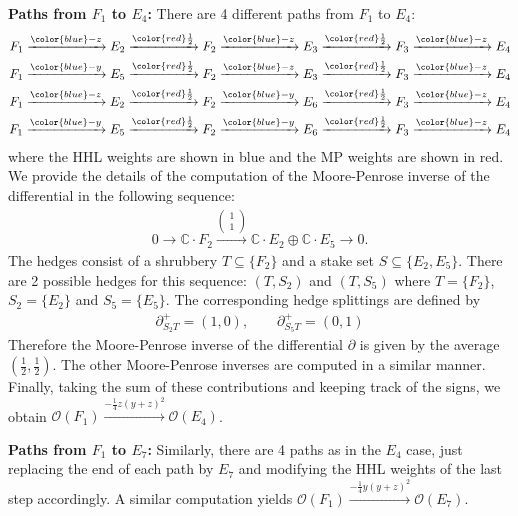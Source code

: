 \documentclass[11pt,reqno]{amsart}
\def\C {{\mathbb C}}
\theoremstyle{definition}
\numberwithin{equation}{section}
\begin{document}
{\bf Paths from $F_1$ to $E_4$:} There are 4 different paths from $F_1$ to $E_4$:
\begin{align*}
    F_1\xrightarrow{\color{blue} -z} E_2\xrightarrow{\color{red}\frac{1}{2}} F_2\xrightarrow{\color{blue}-z} E_3\xrightarrow{\color{red}\frac{1}{2}} F_3\xrightarrow{\color{blue}-z} E_4 \\
    F_1\xrightarrow{\color{blue} -y} E_5\xrightarrow{\color{red}\frac{1}{2}} F_2\xrightarrow{\color{blue}-z} E_3\xrightarrow{\color{red}\frac{1}{2}} F_3\xrightarrow{\color{blue}-z} E_4 \\
    F_1\xrightarrow{\color{blue} -z} E_2\xrightarrow{\color{red}\frac{1}{2}} F_2\xrightarrow{\color{blue}-y} E_6\xrightarrow{\color{red}\frac{1}{2}} F_3\xrightarrow{\color{blue}-z} E_4 \\
    F_1\xrightarrow{\color{blue} -y} E_5\xrightarrow{\color{red}\frac{1}{2}} F_2\xrightarrow{\color{blue}-y} E_6\xrightarrow{\color{red}\frac{1}{2}} F_3\xrightarrow{\color{blue}-z} E_4 
\end{align*}
where the HHL weights are shown in blue and the MP weights are shown in red. We provide the details of the computation of the Moore-Penrose inverse of the differential in the following sequence:
\begin{align*}
    0\rightarrow\C\cdot F_2\xrightarrow{\begin{pmatrix} 1 \\ 1\end{pmatrix}} \C\cdot E_2\oplus \C\cdot E_5 \rightarrow0.
\end{align*}
The hedges consist of a shrubbery $T\subseteq\{F_2\}$ and a stake set $S\subseteq\{E_2,E_5\}$. There are 2 possible hedges for this sequence: $(T,S_2)$ and $(T,S_5)$ where $T=\{F_2\}$, $S_2=\{E_2\}$ and $S_5=\{E_5\}$. The corresponding hedge splittings are defined by
\begin{align*}
    \partial^+_{S_2 T} = (1,0),\qquad \partial^+_{S_5 T} = (0,1)
\end{align*}
Therefore the Moore-Penrose inverse of the differential $\partial$ is given by the average $(\frac{1}{2},\frac{1}{2})$. The other Moore-Penrose inverses are computed in a similar manner. Finally, taking the sum of these contributions and keeping track of the signs, we obtain $\mathcal{O}(F_1)\xrightarrow{-\frac{1}{4}z(y+z)^2}\mathcal{O}(E_4)$.

\smallskip

{\bf Paths from $F_1$ to $E_7$:} Similarly, there are 4 paths as in the $E_4$ case, just replacing the end of each path by $E_7$ and modifying the HHL weights of the last step accordingly. A similar computation yields $\mathcal{O}(F_1)\xrightarrow{-\frac{1}{4}y(y+z)^2}\mathcal{O}(E_7)$.
\end{document}
